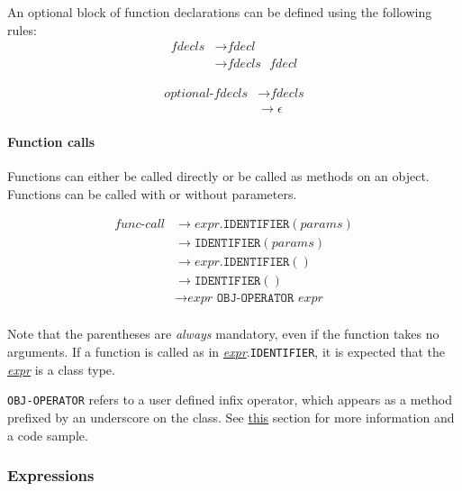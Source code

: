 \documentclass{article}
\begin{document}
An optional block of function declarations can be defined using the following rules:
\label{sec:fdecls}
\begin{align*}
    \textit{fdecls} &\to \hyperref[sec:fdecl]{\textit{fdecl}} \\
    &\to \hyperref[sec:fdecls]{\textit{fdecls}} \texttt{ } \hyperref[sec:fdecl]{\textit{fdecl}}
\end{align*}

\label{sec:optional-fdecls}
\begin{align*}
    \textit{optional-fdecls} &\to \hyperref[sec:fdecls]{\textit{fdecls}} \\
    &\to \epsilon
\end{align*}

\paragraph{Function calls}
Functions can either be called directly or be called as methods on an object. Functions can be called with or without parameters.

\label{sec:func-call}
\begin{align*}
    \textit{func-call} &\to \hyperref[sec:expr]{\textit{expr}}. \texttt{IDENTIFIER}(\hyperref[sec:params]{\textit{params}}) \\
    &\to \texttt{IDENTIFIER}(\hyperref[sec:params]{\textit{params}}) \\
    &\to \hyperref[sec:expr]{\textit{expr}}.\texttt{IDENTIFIER}() \\
    &\to \texttt{IDENTIFIER}() \\
    &\to \hyperref[sec:expr]{\textit{expr}} \texttt{ OBJ-OPERATOR } \hyperref[sec:expr]{\textit{expr}} \\
\end{align*}

Note that the parentheses are \textit{always} mandatory, even if the function takes no arguments. If a function is called as in \hyperref[sec:expr]{\textit{expr}}.\texttt{IDENTIFIER}, it is expected that the \hyperref[sec:expr]{\textit{expr}} is a class type.

\texttt{OBJ-OPERATOR} refers to a user defined infix operator, which appears as a method prefixed by an underscore on the class. See \hyperref[sec:object-operators]{this} section for more information and a code sample.

\subsubsection{Expressions}
\label{sec:expr}
\end{document}
